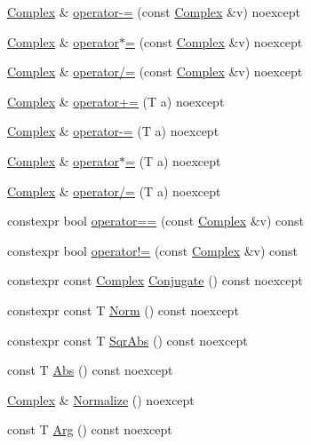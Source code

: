 \begin{DoxyCompactItemize}
\item 
\mbox{\hyperlink{structmage_1_1_complex}{Complex}} \& \mbox{\hyperlink{structmage_1_1_complex_a2a9166690c499558e677c6a049557c3b}{operator-\/=}} (const \mbox{\hyperlink{structmage_1_1_complex}{Complex}} \&v) noexcept
\item 
\mbox{\hyperlink{structmage_1_1_complex}{Complex}} \& \mbox{\hyperlink{structmage_1_1_complex_a2ba6cc76c8a7461a2dda107374f0fc30}{operator$\ast$=}} (const \mbox{\hyperlink{structmage_1_1_complex}{Complex}} \&v) noexcept
\item 
\mbox{\hyperlink{structmage_1_1_complex}{Complex}} \& \mbox{\hyperlink{structmage_1_1_complex_a3cf18056d27dcddae48a30e221ec7925}{operator/=}} (const \mbox{\hyperlink{structmage_1_1_complex}{Complex}} \&v) noexcept
\item 
\mbox{\hyperlink{structmage_1_1_complex}{Complex}} \& \mbox{\hyperlink{structmage_1_1_complex_a95b1978496b88a5679aeefa2f273a46d}{operator+=}} (T a) noexcept
\item 
\mbox{\hyperlink{structmage_1_1_complex}{Complex}} \& \mbox{\hyperlink{structmage_1_1_complex_ab95cb500cec9257a7e45a101c4c4269e}{operator-\/=}} (T a) noexcept
\item 
\mbox{\hyperlink{structmage_1_1_complex}{Complex}} \& \mbox{\hyperlink{structmage_1_1_complex_ab458e82ea17b7d0b07901c91bdab2e28}{operator$\ast$=}} (T a) noexcept
\item 
\mbox{\hyperlink{structmage_1_1_complex}{Complex}} \& \mbox{\hyperlink{structmage_1_1_complex_ab400491e6811a1653f93c8d5f880cfcb}{operator/=}} (T a) noexcept
\item 
constexpr bool \mbox{\hyperlink{structmage_1_1_complex_ad936a066f69269d5dcd6bccf0f4d6597}{operator==}} (const \mbox{\hyperlink{structmage_1_1_complex}{Complex}} \&v) const
\item 
constexpr bool \mbox{\hyperlink{structmage_1_1_complex_a109bf5856aaadf9eacfe32e1e76db50d}{operator!=}} (const \mbox{\hyperlink{structmage_1_1_complex}{Complex}} \&v) const
\item 
constexpr const \mbox{\hyperlink{structmage_1_1_complex}{Complex}} \mbox{\hyperlink{structmage_1_1_complex_a1190d128e494e5feec6c60a5c268cbd8}{Conjugate}} () const noexcept
\item 
constexpr const T \mbox{\hyperlink{structmage_1_1_complex_aa88a54350f311e9744a70d3b70209e96}{Norm}} () const noexcept
\item 
constexpr const T \mbox{\hyperlink{structmage_1_1_complex_a7b9336429e093a97d97e482d551d88ca}{Sqr\+Abs}} () const noexcept
\item 
const T \mbox{\hyperlink{structmage_1_1_complex_a75c16f2723130ef95c87a7255a8d72f9}{Abs}} () const noexcept
\item 
\mbox{\hyperlink{structmage_1_1_complex}{Complex}} \& \mbox{\hyperlink{structmage_1_1_complex_adb3fdb77b1e34fb435fe9d9d1bd3cf8b}{Normalize}} () noexcept
\item 
const T \mbox{\hyperlink{structmage_1_1_complex_a76cf1d92879578518d2b00c8bdf1b3e0}{Arg}} () const noexcept
\end{DoxyCompactItemize}
